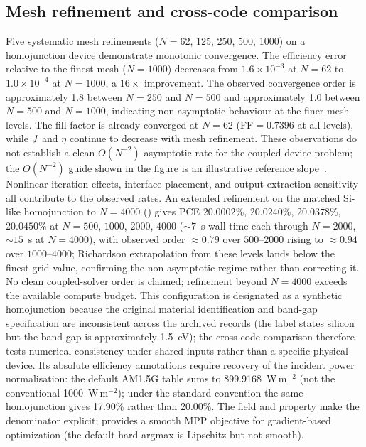\subsection{Mesh refinement and cross-code comparison}
Five systematic mesh refinements ($N=62$, 125, 250, 500, 1000) on a
homojunction device demonstrate monotonic convergence. The efficiency
error relative to the finest mesh ($N=1000$) decreases from $1.6\times10^{-3}$ at $N=62$
to $1.0\times10^{-4}$ at $N=1000$, a $16\times$ improvement. The
observed convergence order is approximately 1.8 between $N=250$ and
$N=500$ and approximately 1.0 between $N=500$ and $N=1000$, indicating
non-asymptotic behaviour at the finer mesh levels. The fill factor is
already converged at $N=62$ (FF$=0.7396$ at all levels), while $J_{\sc}$
and $\eta$ continue to decrease with mesh refinement. These observations
do not establish a clean $O(N^{-2})$ asymptotic rate for the coupled
device problem; the $O(N^{-2})$ guide shown in the figure is an
illustrative reference slope~\cite{salari2000,oberkampf2002}.
Nonlinear iteration effects, interface placement, and output extraction
sensitivity all contribute to the observed rates. An extended refinement
on the matched Si-like homojunction to $N=4000$
() gives PCE $20.0002\%$,
$20.0240\%$, $20.0378\%$, $20.0450\%$ at $N=500$, $1000$, $2000$, $4000$
($\sim7$~s wall time each through $N=2000$, $\sim15$~s at $N=4000$),
with observed order $\approx0.79$ over $500$--$2000$ rising to
$\approx0.94$ over $1000$--$4000$; Richardson extrapolation from
these levels lands below the finest-grid value,
confirming the non-asymptotic regime rather than correcting it. No
clean coupled-solver order is claimed; refinement beyond $N=4000$
exceeds the available compute budget.
This configuration is designated as a synthetic homojunction because the
original material identification and band-gap specification are
inconsistent across the archived records (the label states silicon but the
band gap is approximately 1.5~eV); the cross-code comparison therefore
tests numerical consistency under shared inputs rather than a specific
physical device. Its absolute efficiency annotations require recovery
of the incident power normalisation: the default AM1.5G table sums to
899.9168~W\,m$^{-2}$ (not the conventional 1000~W\,m$^{-2}$);
under the standard convention the same homojunction gives 17.90\%
rather than 20.00\%. The  field and
 property make the denominator
explicit;  provides a smooth MPP
objective for gradient-based optimization (the default hard argmax is
Lipschitz but not smooth).

